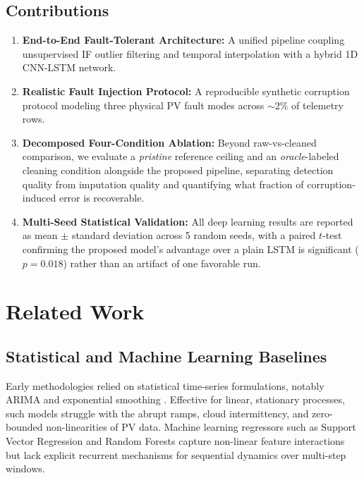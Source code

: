 \documentclass[conference]{IEEEtran}
\begin{document}
\subsection*{Contributions}
\begin{enumerate}
    \item \textbf{End-to-End Fault-Tolerant Architecture:} A unified pipeline coupling unsupervised IF outlier filtering and temporal interpolation with a hybrid 1D CNN-LSTM network.
    \item \textbf{Realistic Fault Injection Protocol:} A reproducible synthetic corruption protocol modeling three physical PV fault modes across $\sim$2\% of telemetry rows.
    \item \textbf{Decomposed Four-Condition Ablation:} Beyond raw-vs-cleaned comparison, we evaluate a \emph{pristine} reference ceiling and an \emph{oracle}-labeled cleaning condition alongside the proposed pipeline, separating detection quality from imputation quality and quantifying what fraction of corruption-induced error is recoverable.
    \item \textbf{Multi-Seed Statistical Validation:} All deep learning results are reported as mean $\pm$ standard deviation across 5 random seeds, with a paired $t$-test confirming the proposed model's advantage over a plain LSTM is significant ($p=0.018$) rather than an artifact of one favorable run.
\end{enumerate}

\section{Related Work}

\subsection{Statistical and Machine Learning Baselines}
Early methodologies relied on statistical time-series formulations, notably ARIMA and exponential smoothing \cite{sobri2018review, zhang2015baseline}. Effective for linear, stationary processes, such models struggle with the abrupt ramps, cloud intermittency, and zero-bounded non-linearities of PV data. Machine learning regressors such as Support Vector Regression and Random Forests capture non-linear feature interactions \cite{abumohsen2024hybrid} but lack explicit recurrent mechanisms for sequential dynamics over multi-step windows.
\end{document}
